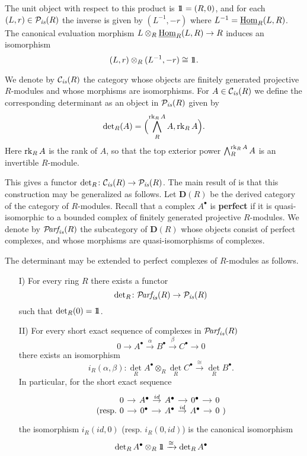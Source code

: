 \documentclass{article}
\numberwithin{equation}{section}
\begin{document}
\begin{appendices}
The unit object with respect to this product is $1\!\!1 = (R,0)$, and for each
$(L,r) \in \mathcal{P}_{\text{\it is}} (R)$ the inverse is given by $(L^{-1}, -r)$ where
$L^{-1} = \underline{\operatorname{Hom}}_R (L,R)$. The canonical evaluation morphism
$L \otimes_R \underline{\operatorname{Hom}}_R (L,R) \to R$ induces an isomorphism
$$(L,r) \otimes_R (L^{-1}, -r) \cong 1\!\!1.$$

\begin{definition}
  \label{dfn:determinant-of-projective-fg-module}
  We denote by $\mathcal{C}_{\text{\it is}} (R)$ the category whose objects are finitely
  generated projective $R$-modules and whose morphisms are isomorphisms.  For
  $A \in \mathcal{C}_{\text{\it is}} (R)$ we define the corresponding determinant as an
  object in $\mathcal{P}_{\text{\it is}} (R)$ given by
  $$\operatorname{det}_R (A) = \Bigl(\bigwedge^{\operatorname{rk}_R A}_R A, \operatorname{rk}_R A\Bigr).$$
  Here $\operatorname{rk}_R A$ is the rank of $A$, so that the top exterior power
  $\bigwedge^{\operatorname{rk}_R A}_R A$ is an invertible $R$-module.
\end{definition}

This gives a functor $\operatorname{det}_R\colon \mathcal{C}_{\text{\it is}} (R) \to \mathcal{P}_{\text{\it is}} (R)$.
The main result of \cite[Chapter~I]{Knudsen-Mumford-1976} is that this
construction may be generalized as follows. Let $\mathbf{D} (R)$ be the derived
category of the category of $R$-modules. Recall that a complex $A^\bullet$ is
\textbf{perfect} if it is quasi-isomorphic to a bounded complex of finitely
generated projective $R$-modules. We denote by $\mathcal{P}\!\text{\it arf}_{\text{\it is}} (R)$ the subcategory
of $\mathbf{D} (R)$ whose objects consist of perfect complexes, and whose
morphisms are quasi-isomorphisms of complexes.

\begin{theorem}
  The determinant may be extended to perfect complexes of $R$-modules as
  follows.

  \begin{enumerate}
  \item[I)] For every ring $R$ there exists a functor
    $$\operatorname{det}_R\colon \mathcal{P}\!\text{\it arf}_{\text{\it is}} (R) \to \mathcal{P}_{\text{\it is}} (R)$$
    such that $\operatorname{det}_R (0) = 1\!\!1$.

  \item[II)] For every short exact sequence of complexes in $\mathcal{P}\!\text{\it arf}_{\text{\it is}} (R)$
    \[ 0 \to A^\bullet \xrightarrow{\alpha} B^\bullet
      \xrightarrow{\beta} C^\bullet \to 0 \]
    there exists an isomorphism
    \[ i_R (\alpha,\beta)\colon
      \det_R A^\bullet \otimes_R \det_R C^\bullet
      \xrightarrow{\cong} \det_R B^\bullet. \]
    In particular, for the short exact sequence
    \[ \begin{tikzcd}[column sep=1em]
        &[-1.5em] 0 \ar{r} & A^\bullet \ar{r}{id} & A^\bullet \ar{r} & 0^\bullet \ar{r} & 0 &[-1.5em] \\[-2em]
        \text{(resp.} & 0 \ar{r} & 0^\bullet \ar{r} & A^\bullet \ar{r}{id} & A^\bullet \ar{r} & 0 & \text{)}
      \end{tikzcd} \]
    the isomorphism $i_R (id,0)$ (resp. $i_R (0,id)$) is the canonical isomorphism
    $$\operatorname{det}_R A^\bullet \otimes_R 1\!\!1 \xrightarrow{\cong} \operatorname{det}_R A^\bullet$$
  \end{enumerate}


\end{theorem}
\end{appendices}
\end{document}
